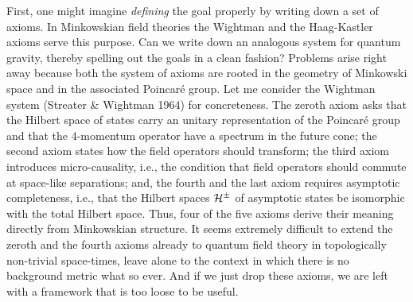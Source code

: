 First, one might imagine {\it defining} the goal properly by writing down
a set of axioms. In Minkowskian field theories the Wightman and the
Haag-Kastler axioms serve this purpose. Can we write down an analogous
system for quantum gravity, thereby spelling out the goals in a clean
fashion? Problems arise right away because both the system of axioms are
rooted in the geometry of Minkowski space and in the associated Poincar\'e
group. Let me consider the Wightman system (Streater \& Wightman 1964) for
concreteness. The zeroth axiom asks that the Hilbert space of states carry an
unitary representation of the Poincar\'e group and that the 4-momentum
operator have a spectrum in the future cone; the second axiom states how the
field operators should transform; the third axiom introduces micro-causality,
i.e., the condition that field operators should commute at space-like
separations; and, the fourth and the last axiom requires asymptotic
completeness, i.e., that the Hilbert spaces ${\cal H}^\pm$ of asymptotic
states be isomorphic with the total Hilbert space. Thus, four of the five
axioms derive their meaning directly from Minkowskian structure. It seems
extremely difficult to extend the zeroth and the fourth axioms already to
quantum field theory in topologically non-trivial space-times, leave alone to
the context in which there is no background metric what so ever. And if we
just drop these axioms, we are left with a framework that is too loose to
be useful.

